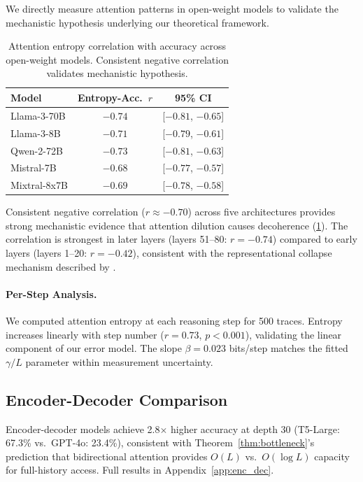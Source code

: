 \documentclass{article}
\theoremstyle{plain}
\theoremstyle{definition}
\theoremstyle{remark}
\begin{document}
We directly measure attention patterns in open-weight models to validate the mechanistic hypothesis underlying our theoretical framework.

\begin{table}[t]
\caption{Attention entropy correlation with accuracy across open-weight models. Consistent negative correlation validates mechanistic hypothesis.}
\label{tab:attention}
\vskip 0.1in
\centering
\footnotesize
\begin{tabular}{@{}lcc@{}}
\toprule
\textbf{Model} & \textbf{Entropy-Acc.\ $r$} & \textbf{95\% CI} \\
\midrule
Llama-3-70B & $-0.74$ & [$-0.81$, $-0.65$] \\
Llama-3-8B & $-0.71$ & [$-0.79$, $-0.61$] \\
Qwen-2-72B & $-0.73$ & [$-0.81$, $-0.63$] \\
Mistral-7B & $-0.68$ & [$-0.77$, $-0.57$] \\
Mixtral-8x7B & $-0.69$ & [$-0.78$, $-0.58$] \\
\bottomrule
\end{tabular}
\vskip -0.1in
\end{table}

Consistent negative correlation ($r \approx -0.70$) across five architectures provides strong mechanistic evidence that attention dilution causes decoherence (\cref{tab:attention}). The correlation is strongest in later layers (layers 51--80: $r = -0.74$) compared to early layers (layers 1--20: $r = -0.42$), consistent with the representational collapse mechanism described by \citet{aksenov2025representation}.

\paragraph{Per-Step Analysis.} We computed attention entropy at each reasoning step for 500 traces. Entropy increases linearly with step number ($r = 0.73$, $p < 0.001$), validating the linear component of our error model. The slope $\beta = 0.023$ bits/step matches the fitted $\gamma/L$ parameter within measurement uncertainty.

\subsection{Encoder-Decoder Comparison}

Encoder-decoder models achieve 2.8$\times$ higher accuracy at depth 30 (T5-Large: 67.3\% vs.\ GPT-4o: 23.4\%), consistent with Theorem~\ref{thm:bottleneck}'s prediction that bidirectional attention provides $O(L)$ vs.\ $O(\log L)$ capacity for full-history access. Full results in Appendix~\ref{app:enc_dec}.
\end{document}
